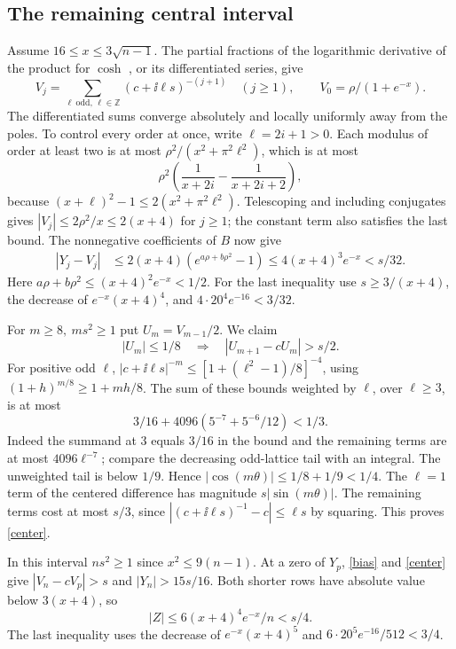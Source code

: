 \subsection{The remaining central interval}
Assume \(16\le x\le3\sqrt{n-1}\). The partial fractions of the logarithmic derivative of the product for \(\cosh\) \cite{dlmf}, or its differentiated series, give
\[
 V_j=\sum_{\ell\ \mathrm{odd},\,\ell\in\mathbb Z}(c+\ii\ell s)^{-(j+1)}
 \quad (j\ge1),\qquad V_0=\rho/(1+e^{-x}).
\]
The differentiated sums converge absolutely and locally uniformly away from the poles. To control every order at once, write \(\ell=2i+1>0\). Each modulus of order at least two is at most \(\rho^2/(x^2+\pi^2\ell^2)\), which is at most
\[
 \rho^2\left(\frac1{x+2i}-\frac1{x+2i+2}\right),
\]
because \((x+\ell)^2-1\le2(x^2+\pi^2\ell^2)\). Telescoping and including conjugates gives \(|V_j|\le2\rho^2/x\le2(x+4)\) for \(j\ge1\); the constant term also satisfies the last bound. The nonnegative coefficients of \(B\) now give
\begin{align}
 |Y_j-V_j|&\le2(x+4)(e^{a\rho+b\rho^2}-1)
 \le4(x+4)^3e^{-x}<s/32.\label{bias}
\end{align}
Here \(a\rho+b\rho^2\le (x+4)^2e^{-x}<1/2\). For the last inequality use \(s\ge3/(x+4)\), the decrease of \(e^{-x}(x+4)^4\), and \(4\cdot20^4e^{-16}<3/32\).

For \(m\ge8,\ ms^2\ge1\) put \(U_m=V_{m-1}/2\). We claim
\begin{equation}\label{center}
 |U_m|\le1/8\quad\Longrightarrow\quad |U_{m+1}-cU_m|>s/2 .
\end{equation}
For positive odd \(\ell\), \(|c+\ii\ell s|^{-m}\le[1+(\ell^2-1)/8]^{-4}\), using \((1+h)^{m/8}\ge1+mh/8\). The sum of these bounds weighted by \(\ell\), over \(\ell\ge3\), is at most
\[
 3/16+4096(5^{-7}+5^{-6}/12)<1/3.
\]
Indeed the summand at 3 equals \(3/16\) in the bound and the remaining terms are at most \(4096\ell^{-7}\); compare the decreasing odd-lattice tail with an integral. The unweighted tail is below \(1/9\). Hence \(|\cos(m\theta)|\le1/8+1/9<1/4\). The \(\ell=1\) term of the centered difference has magnitude \(s|\sin(m\theta)|\). The remaining terms cost at most \(s/3\), since \(|(c+\ii\ell s)^{-1}-c|\le\ell s\) by squaring. This proves \eqref{center}.

In this interval \(ns^2\ge1\) since \(x^2\le9(n-1)\). At a zero of \(Y_p\), \eqref{bias} and \eqref{center} give \(|V_n-cV_p|>s\) and \(|Y_n|>15s/16\). Both shorter rows have absolute value below \(3(x+4)\), so
\[
 |Z|\le 6(x+4)^4e^{-x}/n<s/4.
\]
The last inequality uses the decrease of \(e^{-x}(x+4)^5\) and \(6\cdot 20^5e^{-16}/512<3/4\).

